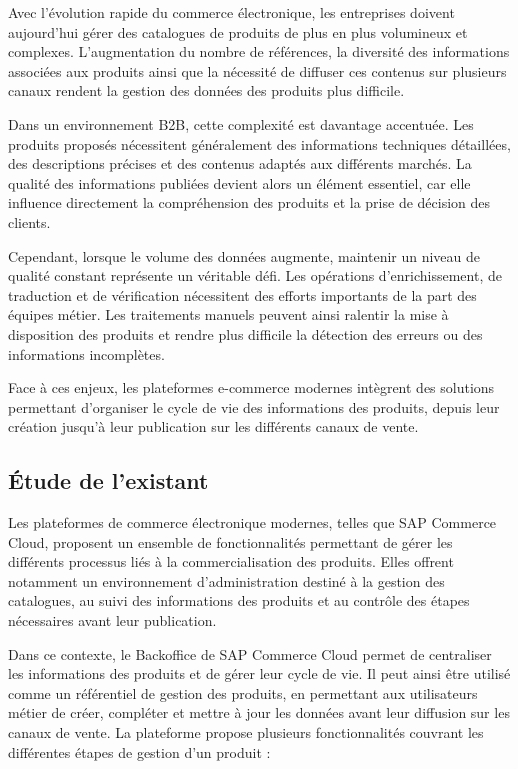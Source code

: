 Avec l'évolution rapide du commerce électronique, les entreprises doivent aujourd'hui gérer des catalogues de produits de plus en plus volumineux et complexes. L'augmentation du nombre de références, la diversité des informations associées aux produits ainsi que la nécessité de diffuser ces contenus sur plusieurs canaux rendent la gestion des données des produits plus difficile.

Dans un environnement B2B, cette complexité est davantage accentuée. Les produits proposés nécessitent généralement des informations techniques détaillées, des descriptions précises et des contenus adaptés aux différents marchés. La qualité des informations publiées devient alors un élément essentiel, car elle influence directement la compréhension des produits et la prise de décision des clients.

Cependant, lorsque le volume des données augmente, maintenir un niveau de qualité constant représente un véritable défi. Les opérations d'enrichissement, de traduction et de vérification nécessitent des efforts importants de la part des équipes métier. Les traitements manuels peuvent ainsi ralentir la mise à disposition des produits et rendre plus difficile la détection des erreurs ou des informations incomplètes.

Face à ces enjeux, les plateformes e-commerce modernes intègrent des solutions permettant d'organiser le cycle de vie des informations des produits, depuis leur création jusqu'à leur publication sur les différents canaux de vente.

\subsection{Étude de l'existant}

Les plateformes de commerce électronique modernes, telles que SAP Commerce Cloud, proposent un ensemble de fonctionnalités permettant de gérer les différents processus liés à la commercialisation des produits. Elles offrent notamment un environnement d'administration destiné à la gestion des catalogues, au suivi des informations des produits et au contrôle des étapes nécessaires avant leur publication.

Dans ce contexte, le Backoffice de SAP Commerce Cloud permet de centraliser les informations des produits et de gérer leur cycle de vie. Il peut ainsi être utilisé comme un référentiel de gestion des produits, en permettant aux utilisateurs métier de créer, compléter et mettre à jour les données avant leur diffusion sur les canaux de vente.
\newpage
La plateforme propose plusieurs fonctionnalités couvrant les différentes étapes de gestion d'un produit :

